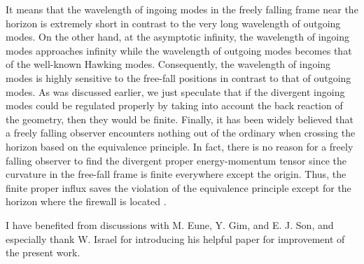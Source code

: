 \documentclass[aps,preprint,a4paper,showpacs,showkeys,superscriptaddress]{revtex4-1}
\begin{document}
It means that the wavelength of ingoing modes in the freely falling frame near the horizon
is extremely short in contrast to the very long wavelength of outgoing modes.
On the other hand, at the asymptotic infinity,
the wavelength of ingoing modes approaches infinity while the wavelength of outgoing modes becomes
that of the well-known Hawking modes.
Consequently, the wavelength of ingoing modes is highly sensitive to the free-fall positions
in contrast to that of outgoing modes. As was discussed earlier,
we just speculate that if the divergent ingoing modes
could be regulated properly by taking into account the back reaction of the
geometry, then they would be finite.
Finally, it has been widely believed that a freely falling observer
encounters nothing out of the ordinary when crossing the horizon based on the equivalence principle.
In fact, there is no reason for a freely falling observer to find the divergent proper energy-momentum tensor since
the curvature in the free-fall frame is finite everywhere except the origin.
Thus, the finite proper influx saves
the violation of the equivalence principle except for the horizon where
the firewall is located \cite{Almheiri:2012rt}.







\acknowledgments
I have benefited from discussions with M. Eune, Y. Gim, and E. J. Son, and especially thank W. Israel for introducing his
helpful paper for improvement of the present work.
\end{document}
